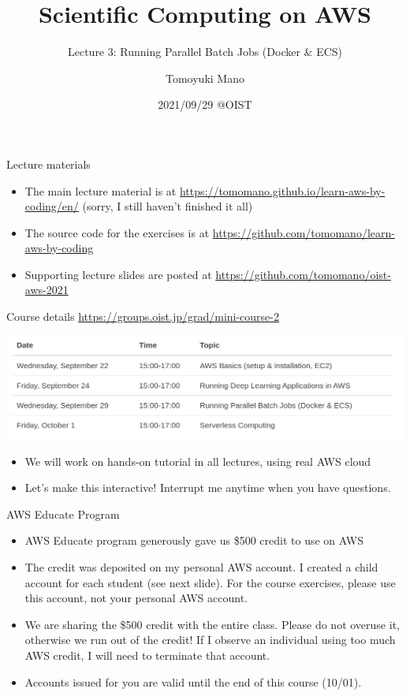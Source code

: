 \documentclass[unicode,11pt]{beamer}
\title{Scientific Computing on AWS}
\subtitle{Lecture 3: Running Parallel Batch Jobs (Docker & ECS)}
\author{Tomoyuki Mano}
\institute[OIST]{Okinawa Institute of Science and Technology}
\date{2021/09/29 @OIST}
\begin{document}
\frame{\titlepage}

\begin{frame}{Lecture materials}
\begin{itemize}
    \item The main lecture material is at
    \url{https://tomomano.github.io/learn-aws-by-coding/en/}
    (sorry, I still haven't finished it all)
    \item The source code for the exercises is at
    \url{https://github.com/tomomano/learn-aws-by-coding}
    \item Supporting lecture slides are posted at
    \url{https://github.com/tomomano/oist-aws-2021}
\end{itemize}
\end{frame}

\begin{frame}{Course details}
\centering
\url{https://groups.oist.jp/grad/mini-course-2}

\vspace{10pt}

\includegraphics[width=1.0\textwidth]{imgs/schedule.png}

\begin{itemize}
    \item We will work on hands-on tutorial in all lectures, using real AWS cloud
    \item Let's make this interactive! Interrupt me anytime when you have questions.
\end{itemize}
\end{frame}

\begin{frame}{AWS Educate Program}

\begin{itemize}
    \item AWS Educate program generously gave us \$500 credit to use on AWS
    \item The credit was deposited on my personal AWS account.
    I created a child account for each student (see next slide).
    For the course exercises, please use this account, not your personal AWS account.
    \item We are sharing the \$500 credit with the entire class.
    Please do not overuse it, otherwise we run out of the credit!
    If I observe an individual using too much AWS credit, I will need to terminate that account.
    \item Accounts issued for you are valid until the end of this course (10/01).
\end{itemize}
\end{frame}
\end{document}
